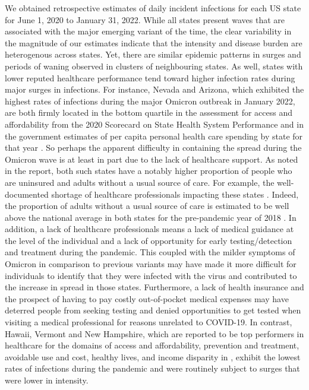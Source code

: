 \documentclass{article}
\begin{document}
We obtained retrospective estimates of daily incident infections for each US
state for June 1, 2020 to January 31, 2022. While all states present waves that
are associated with the major emerging variant of the time, the clear
variability in the magnitude of our estimates indicate that the intensity and
disease burden are heterogenous across states. Yet, there are similar epidemic
patterns in surges and periods of waning observed in clusters of neighbouring
states. As well, states with lower reputed healthcare performance tend toward
higher infection rates during major surges in infections. For instance, Nevada
and Arizona, which exhibited the highest rates of infections during the major
Omicron outbreak in January 2022, are both firmly located in the bottom quartile
in the assessment for access and affordability from the 2020 Scorecard on State
Health System Performance \citep{radley2020} and in the government estimates of
per capita personal health care spending by state for that year
\citep{centers2020health}. So perhaps the apparent difficulty in containing the
spread during the Omicron wave is at least in part due to the lack of healthcare
support. As noted in the report, both such states have a notably higher
proportion of people who are uninsured and adults without a usual source of
care. For example, the well-documented shortage of healthcare professionals
impacting these states \citep{do2023nevada, gong2019higher}. Indeed, the
proportion of adults without a usual source of care is estimated to be well
above the national average in both states for the pre-pandemic year of 2018
\citep{radley2020}. In addition, a lack of healthcare professionals means a lack
of medical guidance at the level of the individual and a lack of opportunity for
early testing/detection and treatment during the pandemic. This coupled with the
milder symptoms of Omicron in comparison to previous variants may have made it
more difficult for individuals to identify that they were infected with the
virus and contributed to the increase in spread in those states. Furthermore, a
lack of health insurance and the prospect of having to pay costly out-of-pocket
medical expenses may have deterred people from seeking testing
\citep{embrett2022barriers} and denied opportunities to get tested when visiting
a medical professional for reasons unrelated to COVID-19. In contrast, Hawaii,
Vermont and New Hampshire, which are reported to be top performers in healthcare
for the domains of access and affordability, prevention and treatment, avoidable
use and cost, healthy lives, and income disparity in \citet{radley2020}, exhibit
the lowest rates of infections during the pandemic and were routinely subject to
surges that were lower in intensity.
\end{document}

